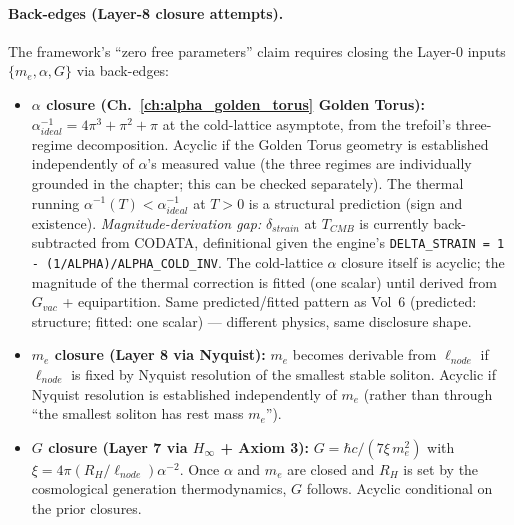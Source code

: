 \paragraph{Back-edges (Layer-8 closure attempts).}
The framework's ``zero free parameters'' claim requires closing the Layer-0 inputs $\{m_e, \alpha, G\}$ via back-edges:
\begin{itemize}
    \item \textbf{$\alpha$ closure (Ch.~\ref{ch:alpha_golden_torus} Golden Torus):} $\alpha^{-1}_{ideal} = 4\pi^3 + \pi^2 + \pi$ at the cold-lattice asymptote, from the trefoil's three-regime decomposition. Acyclic if the Golden Torus geometry is established independently of $\alpha$'s measured value (the three regimes are individually grounded in the chapter; this can be checked separately). The thermal running $\alpha^{-1}(T) < \alpha^{-1}_{ideal}$ at $T > 0$ is a structural prediction (sign and existence). \emph{Magnitude-derivation gap:} $\delta_{strain}$ at $T_{CMB}$ is currently back-subtracted from CODATA, definitional given the engine's \texttt{DELTA\_STRAIN = 1 - (1/ALPHA)/ALPHA\_COLD\_INV}. The cold-lattice $\alpha$ closure itself is acyclic; the magnitude of the thermal correction is fitted (one scalar) until derived from $G_{vac}$ + equipartition. Same predicted/fitted pattern as Vol~6 (predicted: structure; fitted: one scalar) --- different physics, same disclosure shape.
    \item \textbf{$m_e$ closure (Layer 8 via Nyquist):} $m_e$ becomes derivable from $\ell_{node}$ if $\ell_{node}$ is fixed by Nyquist resolution of the smallest stable soliton. Acyclic if Nyquist resolution is established independently of $m_e$ (rather than through ``the smallest soliton has rest mass $m_e$'').
    \item \textbf{$G$ closure (Layer 7 via $H_\infty$ + Axiom 3):} $G = \hbar c/(7\xi\,m_e^2)$ with $\xi = 4\pi(R_H/\ell_{node})\alpha^{-2}$. Once $\alpha$ and $m_e$ are closed and $R_H$ is set by the cosmological generation thermodynamics, $G$ follows. Acyclic conditional on the prior closures.
\end{itemize}


